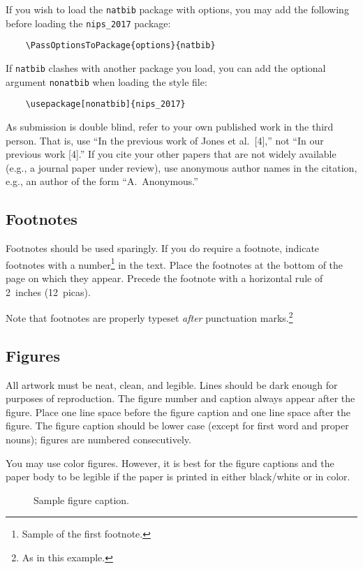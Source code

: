 \documentclass{article}
\begin{document}
	If you wish to load the \verb+natbib+ package with options, you may
	add the following before loading the \verb+nips_2017+ package:
	\begin{verbatim}
	\PassOptionsToPackage{options}{natbib}
	\end{verbatim}
	
	If \verb+natbib+ clashes with another package you load, you can add
	the optional argument \verb+nonatbib+ when loading the style file:
	\begin{verbatim}
	\usepackage[nonatbib]{nips_2017}
	\end{verbatim}
	
	As submission is double blind, refer to your own published work in the
	third person. That is, use ``In the previous work of Jones et
	al.\ [4],'' not ``In our previous work [4].'' If you cite your other
	papers that are not widely available (e.g., a journal paper under
	review), use anonymous author names in the citation, e.g., an author
	of the form ``A.\ Anonymous.''
	
	\subsection{Footnotes}
	
	Footnotes should be used sparingly.  If you do require a footnote,
	indicate footnotes with a number\footnote{Sample of the first
		footnote.} in the text. Place the footnotes at the bottom of the
	page on which they appear.  Precede the footnote with a horizontal
	rule of 2~inches (12~picas).
	
	Note that footnotes are properly typeset \emph{after} punctuation
	marks.\footnote{As in this example.}
	
	\subsection{Figures}
	
	All artwork must be neat, clean, and legible. Lines should be dark
	enough for purposes of reproduction. The figure number and caption
	always appear after the figure. Place one line space before the figure
	caption and one line space after the figure. The figure caption should
	be lower case (except for first word and proper nouns); figures are
	numbered consecutively.
	
	You may use color figures.  However, it is best for the figure
	captions and the paper body to be legible if the paper is printed in
	either black/white or in color.
	\begin{figure}[h]
		\centering
		\fbox{\rule[-.5cm]{0cm}{4cm} \rule[-.5cm]{4cm}{0cm}}
		\caption{Sample figure caption.}
	\end{figure}
	
\end{document}
